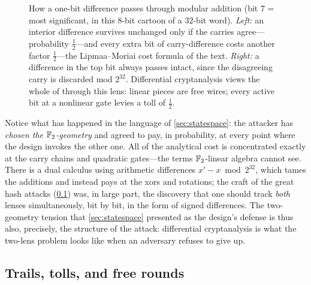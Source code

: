 \begin{figure}[ht]
  \caption{How a one-bit difference passes through modular addition
  (bit $7$ = most significant, in this $8$-bit cartoon of a $32$-bit
  word). \emph{Left:} an interior difference survives unchanged only if
  the carries agree---probability $\tfrac12$---and every extra bit of
  carry-difference costs another factor $\tfrac12$---the Lipmaa--Moriai
  cost formula of the text. \emph{Right:} a difference in the top bit
  always passes intact, since the disagreeing carry is discarded mod
  $2^{32}$. Differential cryptanalysis views the whole of \SHA{}
  through this lens: linear pieces are free wires; every active bit at
  a nonlinear gate levies a toll of $\tfrac12$.}
  \label{fig:diffadd}
\end{figure}

Notice what has happened in the language of \cref{sec:statespace}: the
attacker has \emph{chosen the $\mathbb{F}_2$-geometry} and agreed to pay, in
probability, at every point where the design invokes the other one. All
of the analytical cost is concentrated exactly at the carry chains and
quadratic gates---the terms $\mathbb{F}_2$-linear algebra cannot see. There is
a dual calculus using arithmetic differences $x' - x \bmod 2^{32}$,
which tames the additions and instead pays at the xors and rotations;
the craft of the great hash attacks (\cref{sec:craft}) was, in large
part, the discovery that one should track \emph{both} lenses
simultaneously, bit by bit, in the form of signed differences. The
two-geometry tension that \cref{sec:statespace} presented as the
design's defense is thus also, precisely, the structure of the attack:
differential cryptanalysis is what the two-lens problem looks like when
an adversary refuses to give up.

\subsection{Trails, tolls, and free rounds}\label{sec:craft}

